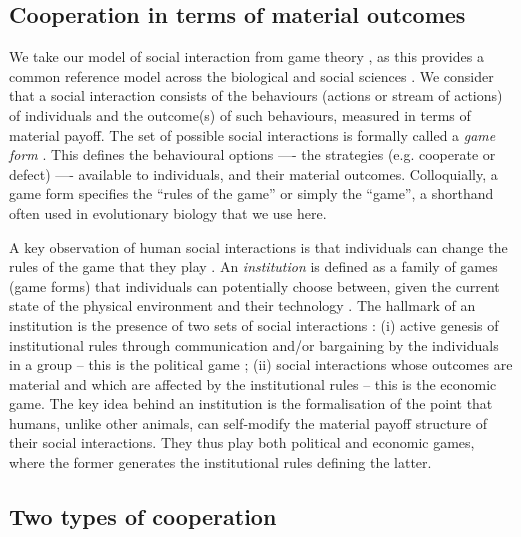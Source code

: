 \documentclass[10pt, a4paper, fleqn]{article}
\begin{document}
\subsection*{Cooperation in terms of material outcomes}

We take our model of social interaction from game theory \citep{Fudenberg:1991:a,Hurwicz:1996:a}, as this provides a common reference model across the biological and social sciences \citep{Gintis:2007:a}. We consider that a social interaction consists of the behaviours (actions or stream of actions) of individuals and the outcome(s) of such behaviours, measured in terms of material payoff. The set of possible social interactions is formally called a \textit{game form} \citep{Hurwicz:1996:a,Fudenberg:1991:a}. This defines the behavioural options —- the strategies (e.g. cooperate or defect)  —- available to individuals, and their material outcomes. Colloquially, a game form specifies the ``rules of the game'' or simply the ``game'', a shorthand often used in evolutionary biology that we use here.

A key observation of human social interactions is that individuals can change the rules of the game that they play \citep{North:1990:a,Ostrom:1990:a,Hurwicz:1996:a,Greif:2006:a,Kaplan:2005:a}. An \textit{institution} is defined as a family of games (game forms) that individuals can potentially choose between, given the current state of the physical environment and their technology \citep{Hurwicz:1996:a}. The hallmark of an institution is the presence of two sets of social interactions
\citep[p.~3]{Powers:2016:a}: (i) active genesis of institutional rules through communication and/or bargaining by the individuals in a group -- this is the political game \citep{Hurwicz:1996:a,Reiter:1996:a}; (ii) social interactions whose outcomes are material and which are affected by the institutional rules -- this is the economic game. The key idea behind an institution is the formalisation of the point that humans, unlike other animals, can self-modify the material payoff structure of their social interactions. They thus play both political and economic games, where the former generates the institutional rules defining the latter. 

\subsection*{Two types of cooperation}
\end{document}
